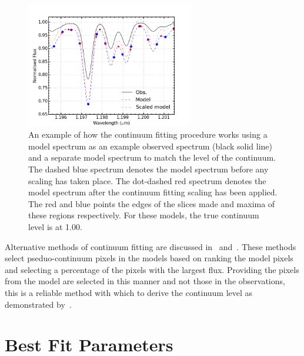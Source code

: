 \begin{figure}
 \centering
\includegraphics[width=0.65\textwidth]{JAnal/cftaction}
\caption[Example of continuum fitting]{
An example of how the continuum fitting procedure works using a model spectrum as
an example observed spectrum (black solid line)
and a separate model spectrum to match the level of the continuum.
The dashed blue spectrum denotes the model spectrum before any scaling has taken place.
The dot-dashed red spectrum denotes the model spectrum after the continuum fitting scaling has been applied.
The red and blue points the edges of the slices made and maxima of these regions respectively.
For these models, the true continuum level is at 1.00.\label{fig:cftaction}
         }
\end{figure}



Alternative methods of continuum fitting are discussed in~\cite{2010MNRAS.407.1203D} and~\cite{2011A&A...527A..50E}.
These methods select pseduo-continuum pixels in the models based on ranking the model pixels and selecting a percentage of the pixels with the largest flux.
Providing the pixels from the model are selected in this manner and not those in the observations, this is a reliable method with which to derive the continuum level as demonstrated by~\cite{2015ApJ...806...21D}.

\section{Best Fit Parameters} %
\label{sub:best_fit_parameters}

